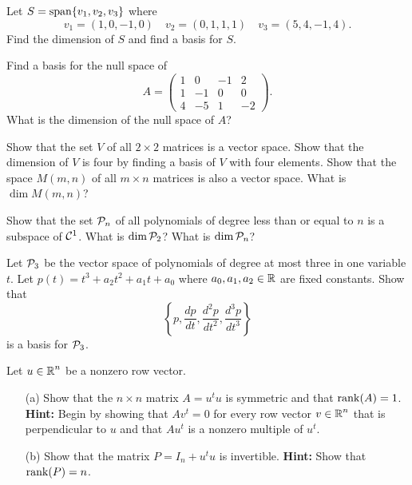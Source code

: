 \documentclass{ximera}
\begin{document}
\begin{exercise} \label{c5.5.2}
Let $S={\rm span}\{v_1,v_2,v_3\}$ where
\[
v_1=(1,0,-1,0) \quad v_2=(0,1,1,1) \quad v_3=(5,4,-1,4).
\]
Find the dimension of $S$ and find a basis for $S$.
\end{exercise}

\begin{exercise} \label{c5.5.3}
Find a basis for the null space of
\[
A =\left(\begin{array}{rrrr} 1 & 0 & -1 & 2\\ 1 & -1 & 0 & 0\\
4 & -5 & 1 & -2 \end{array} \right).
\]
What is the dimension of the null space of $A$?
\end{exercise}

\begin{exercise} \label{c5.5.4}
Show that the set $V$ of all $2\times 2$ matrices is a vector space.
Show that the dimension of $V$ is four by finding a basis of $V$
with four elements.  Show that the space $M(m,n)$ of all $m\times n$
matrices is also a vector space.  What is $\dim M(m,n)$?
\end{exercise}

\begin{exercise} \label{c5.5.5}
Show that the set ${\cal P}_n$ of all polynomials of degree less than
or equal to $n$ is a subspace of ${\cal C}^1$.  What is $\dim {\cal P}_2$?
What is $\dim {\cal P}_n$?
\end{exercise}

\begin{exercise} \label{c5.5.6}
Let ${\cal P}_3$ be the vector space of polynomials of degree at
most three in one variable $t$.  Let $p(t)=t^3+a_2t^2+a_1t+a_0$ where
$a_0,a_1,a_2\in\mbox{$\Bbb{R}$}$ are fixed constants.  Show that
\[
\left\{ p, \frac{dp}{dt}, \frac{d^2p}{dt^2}, \frac{d^3p}{dt^3}\right\}
\]
is a basis for ${\cal P}_3$.
\end{exercise}

\begin{exercise} \label{c5.5.7}
Let $u\in\mbox{$\Bbb{R}$}^n$ be a nonzero row vector.
\begin{itemize}
\item[(a)] Show that the $n\times n$ matrix $A=u^tu$ is symmetric and
  that ${\rm rank}(A)=1$.  {\bf Hint:} Begin by showing that $Av^t=0$ for
  every row vector $v\in\mbox{$\Bbb{R}$}^n$ that is perpendicular to $u$ and that
  $Au^t$ is a nonzero multiple of $u^t$.
\item[(b)]  Show that the matrix $P=I_n+u^tu$ is invertible.  {\bf Hint:}
Show that ${\rm rank}(P)=n$.
\end{itemize}
\end{exercise}
\end{document}
